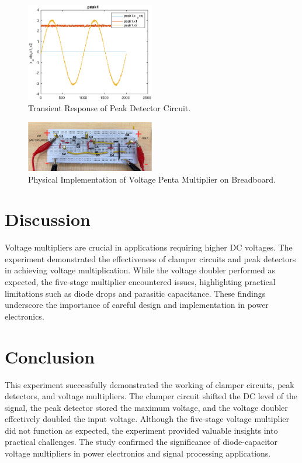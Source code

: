 \documentclass[9pt,conference]{IEEEtran}
\begin{document}
\begin{figure}[H]
\centering
\includegraphics[width=0.5\textwidth]{peak.eps}
\caption{\label{fig:transient_peak}Transient Response of Peak Detector Circuit.}
\end{figure}

\begin{figure}[H]
\centering
\includegraphics[width=0.5\textwidth]{penta_board.png}
\caption{\label{fig:physical}Physical Implementation of Voltage Penta Multiplier on Breadboard.}
\end{figure}

\section{Discussion}
Voltage multipliers are crucial in applications requiring higher DC voltages. The experiment demonstrated the effectiveness of clamper circuits and peak detectors in achieving voltage multiplication. While the voltage doubler performed as expected, the five-stage multiplier encountered issues, highlighting practical limitations such as diode drops and parasitic capacitance. These findings underscore the importance of careful design and implementation in power electronics.

\section{Conclusion}
This experiment successfully demonstrated the working of clamper circuits, peak detectors, and voltage multipliers. The clamper circuit shifted the DC level of the signal, the peak detector stored the maximum voltage, and the voltage doubler effectively doubled the input voltage. Although the five-stage voltage multiplier did not function as expected, the experiment provided valuable insights into practical challenges. The study confirmed the significance of diode-capacitor voltage multipliers in power electronics and signal processing applications.
\end{document}
